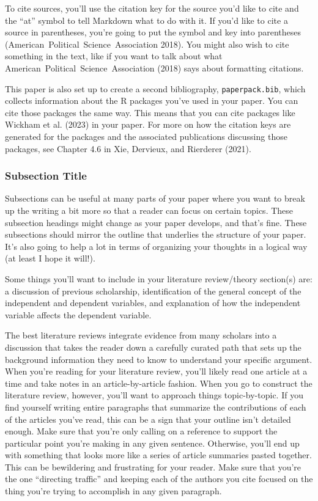 \documentclass[12pt]{article}
\begin{document}
To cite sources, you'll use the citation key for the source you'd like to cite and the ``at'' symbol to tell Markdown what to do with it. If you'd like to cite a source in parentheses, you're going to put the symbol and key into parentheses (American~Political~Science~Association 2018). You might also wish to cite something in the text, like if you want to talk about what American~Political~Science~Association (2018) says about formatting citations.

This paper is also set up to create a second bibliography, \texttt{paperpack.bib}, which collects information about the R packages you've used in your paper. You can cite those packages the same way. This means that you can cite packages like Wickham et al. (2023) in your paper. For more on how the citation keys are generated for the packages and the associated publications discussing those packages, see Chapter 4.6 in Xie, Dervieux, and Rierderer (2021).

\hypertarget{subsection-title}{%
\subsubsection{Subsection Title}\label{subsection-title}}

Subsections can be useful at many parts of your paper where you want to break up the writing a bit more so that a reader can focus on certain topics. These subsection headings might change as your paper develops, and that's fine. These subsections should mirror the outline that underlies the structure of your paper. It's also going to help a lot in terms of organizing your thoughts in a logical way (at least I hope it will!).

Some things you'll want to include in your literature review/theory section(s) are: a discussion of previous scholarship, identification of the general concept of the independent and dependent variables, and explanation of how the independent variable affects the dependent variable.

The best literature reviews integrate evidence from many scholars into a discussion that takes the reader down a carefully curated path that sets up the background information they need to know to understand your specific argument. When you're reading for your literature review, you'll likely read one article at a time and take notes in an article-by-article fashion. When you go to construct the literature review, however, you'll want to approach things topic-by-topic. If you find yourself writing entire paragraphs that summarize the contributions of each of the articles you've read, this can be a sign that your outline isn't detailed enough. Make sure that you're only calling on a reference to support the particular point you're making in any given sentence. Otherwise, you'll end up with something that looks more like a series of article summaries pasted together. This can be bewildering and frustrating for your reader. Make sure that you're the one ``directing traffic'' and keeping each of the authors you cite focused on the thing you're trying to accomplish in any given paragraph.
\end{document}
